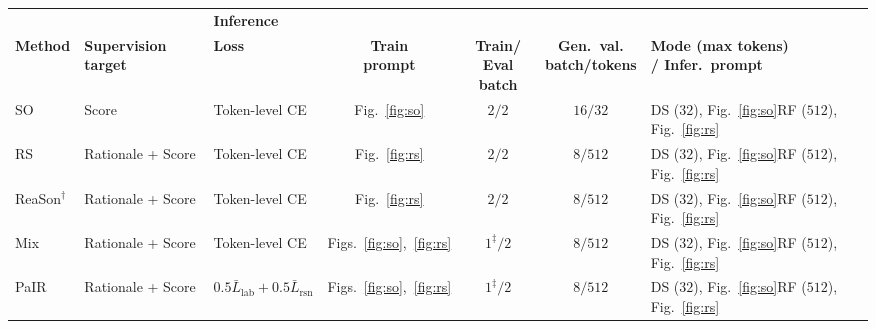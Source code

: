\begin{table}[t]
\centering
\footnotesize
\setlength{\tabcolsep}{4pt}
\renewcommand{\arraystretch}{1.25}
\begin{tabularx}{\textwidth}{@{}
  l                                   %
  >{\raggedright\arraybackslash}X     %
  >{\raggedright\arraybackslash}X     %
  c                                   %
  c                                   %
  c                                   %
  >{\raggedright\arraybackslash}X     %
@{}}
\toprule
& \multicolumn{5}{c}{\textbf{Training}} & \textbf{Inference} \\
\cmidrule(lr){2-6}\cmidrule(lr){7-7}
\textbf{Method} &
\textbf{Supervision target} &
\textbf{Loss} &
\shortstack{\textbf{Train}\\\textbf{prompt}} &
\shortstack{\textbf{Train/}\\\textbf{Eval batch}} &
\shortstack{\textbf{Gen.\ val.}\\\textbf{batch/tokens}} &
\shortstack{\textbf{Mode (max tokens)}\\\textbf{/ Infer.\ prompt}} \\
\midrule
SO & Score & Token-level CE
  & Fig.~\ref{fig:so} & $2/2$ & $16/32$
  & DS ($32$), Fig.~\ref{fig:so}\newline RF ($512$), Fig.~\ref{fig:rs} \\
\addlinespace[2pt]
RS & Rationale + Score & Token-level CE
  & Fig.~\ref{fig:rs} & $2/2$ & $8/512$
  & DS ($32$), Fig.~\ref{fig:so}\newline RF ($512$), Fig.~\ref{fig:rs} \\
\addlinespace[2pt]
ReaSon$^{\dagger}$ & Rationale + Score & Token-level CE
  & Fig.~\ref{fig:rs} & $2/2$ & $8/512$
  & DS ($32$), Fig.~\ref{fig:so}\newline RF ($512$), Fig.~\ref{fig:rs} \\
\addlinespace[2pt]
Mix & Rationale + Score & Token-level CE
  & Figs.~\ref{fig:so},~\ref{fig:rs} & $1^{\ddagger}/2$ & $8/512$
  & DS ($32$), Fig.~\ref{fig:so}\newline RF ($512$), Fig.~\ref{fig:rs} \\
\addlinespace[2pt]
PaIR & Rationale + Score & $0.5\bar{L}_{\mathrm{lab}}+0.5\bar{L}_{\mathrm{rsn}}$
  & Figs.~\ref{fig:so},~\ref{fig:rs} & $1^{\ddagger}/2$ & $8/512$
  & DS ($32$), Fig.~\ref{fig:so}\newline RF ($512$), Fig.~\ref{fig:rs} \\

\end{tabularx}
\end{table}
